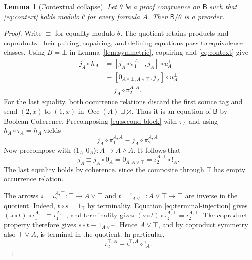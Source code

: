 \documentclass[11pt]{article}
\newtheorem{lemma}[theorem]{Lemma}
\newcommand{\B}{\mathsf B}
\newcommand{\Occ}{\operatorname{Occ}}
\begin{document}
\begin{lemma}[Contextual collapse]\label{lem:collapse}
Let $\theta$ be a proof congruence on $\B$ such that
\eqref{eq:context} holds modulo $\theta$ for every formula $A$.
Then $\B/\theta$ is a preorder.
\end{lemma}

\begin{proof}
Write $\equiv$ for equality modulo $\theta$.
The quotient retains products and coproducts: their pairing,
copairing, and defining equations pass to equivalence classes.
Using $B=\bot$ in Lemma~\ref{lem:symmetric}, copairing and
\eqref{eq:context} give
\begin{equation}
 \begin{aligned}
 j_A\circ h_A
   &=[j_A\circ\pi_1^{A,\bot},j_A]\circ u_A^\bot\\
   &\equiv[0_{A\wedge\bot,A\vee\top},j_A]\circ u_A^\bot\\
   &=j_A\circ\pi_2^{A,A}.
 \end{aligned}
 \label{eq:second-block}
\end{equation}
For the last equality, both occurrence relations discard the first
source tag and send $(2,x)$ to $(1,x)$ in $\Occ(A)\sqcup\varnothing$.
Thus it is an equation of $\B$ by Boolean Coherence.
Precomposing \eqref{eq:second-block} with $\tau_A$ and using
$h_A\circ\tau_A=h_A$ yields
\[
 j_A\circ\pi_1^{A,A}\equiv j_A\circ\pi_2^{A,A}.
\]
Now precompose with $\langle1_A,0_A\rangle:A\to A\wedge A$.
It follows that
\begin{equation}
 j_A\equiv j_A\circ0_A
   =0_{A,A\vee\top}
   =\iota_2^{A,\top}\circ!_A.
 \label{eq:terminal-injection}
\end{equation}
The last equality holds by coherence, since the composite through
$\top$ has empty occurrence relation.

The arrows $s=\iota_2^{A,\top}:\top\to A\vee\top$ and
$t=!_{A\vee\top}:A\vee\top\to\top$ are inverse in the quotient.
Indeed, $t\circ s=1_\top$ by terminality. Equation
\eqref{eq:terminal-injection} gives
$(s\circ t)\circ\iota_1^{A,\top}\equiv\iota_1^{A,\top}$, and
terminality gives
$(s\circ t)\circ\iota_2^{A,\top}=\iota_2^{A,\top}$.
The coproduct property therefore gives $s\circ t\equiv1_{A\vee\top}$.
Hence $A\vee\top$, and by coproduct symmetry also $\top\vee A$,
is terminal in the quotient. In particular,
\begin{equation}
 \iota_2^{\top,A}\equiv\iota_1^{\top,A}\circ!_A.
 \label{eq:other-injection}
\end{equation}


\end{proof}
\end{document}
